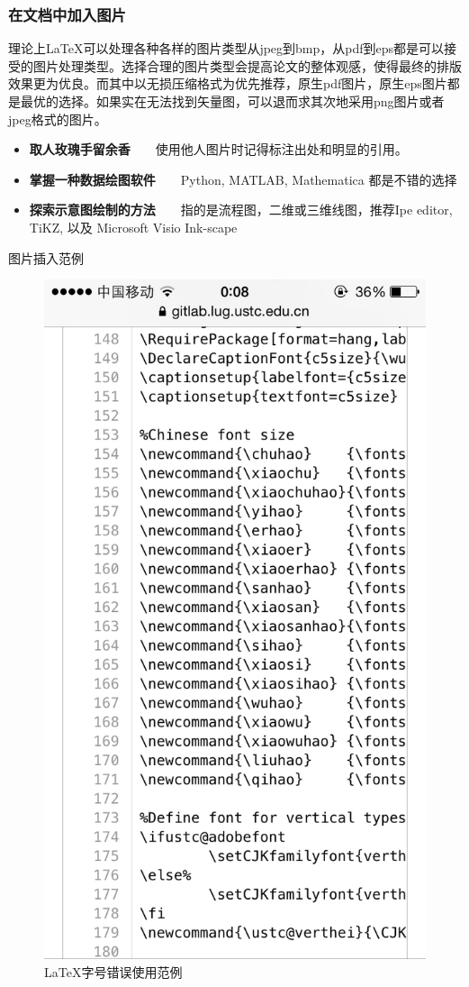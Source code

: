 \subsubsection{在文档中加入图片}
理论上\LaTeX 可以处理各种各样的图片类型从jpeg到bmp，从pdf到eps都是可以接受的图片处理类型。选择合理的图片类型会提高论文的整体观感，使得最终的排版效果更为优良。而其中以无损压缩格式为优先推荐，原生pdf图片，原生eps图片都是最优的选择。如果实在无法找到矢量图，可以退而求其次地采用png图片或者jpeg格式的图片。
\begin{itemize}
\item \textbf{取人玫瑰手留余香}~~~~使用他人图片时记得标注出处和明显的引用。
\item \textbf{掌握一种数据绘图软件}~~~~Python, MATLAB, Mathematica 都是不错的选择
\item \textbf{探索示意图绘制的方法}~~~~指的是流程图，二维或三维线图，推荐Ipe editor, TiKZ, 以及 Microsoft Visio Ink-scape
\end{itemize}
图片插入范例
\begin{figure}[thbp!]
\centering
\includegraphics[width=0.4\linewidth]{figure/IMG_1832}
\caption{\LaTeX 字号错误使用范例}
\label{fig:IMG_1832}
\end{figure}

